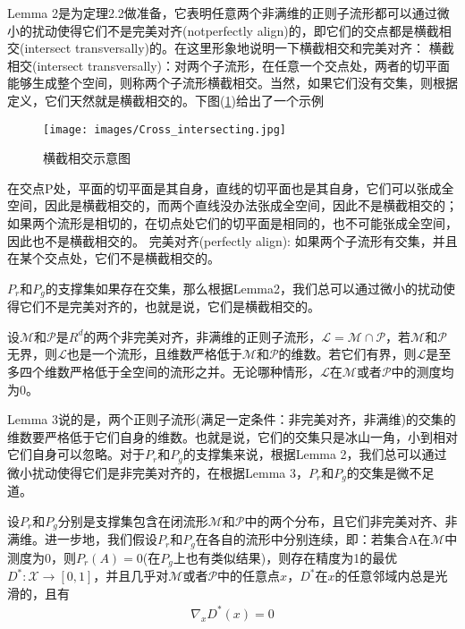             \par
            Lemma 2是为定理2.2做准备，它表明任意两个非满维的正则子流形都可以通过微小的扰动使得它们不是完美对齐(notperfectly align)的，即它们的交点都是横截相交(intersect transversally)的。在这里形象地说明一下横截相交和完美对齐：
            横截相交(intersect transversally)：对两个子流形，在任意一个交点处，两者的切平面能够生成整个空间，则称两个子流形横截相交。当然，如果它们没有交集，则根据定义，它们天然就是横截相交的。下图(\ref{fig:横截相交示意图})给出了一个示例
                \begin{figure}[H]
                \centering
                \texttt{[image: images/Cross\_intersecting.jpg]}
                \caption{横截相交示意图}
                \label{fig:横截相交示意图}
                \end{figure}
            在交点P处，平面的切平面是其自身，直线的切平面也是其自身，它们可以张成全空间，因此是横截相交的，而两个直线没办法张成全空间，因此不是横截相交的；如果两个流形是相切的，在切点处它们的切平面是相同的，也不可能张成全空间，因此也不是横截相交的。
            完美对齐(perfectly align): 如果两个子流形有交集，并且在某个交点处，它们不是横截相交的。
            \par
            $P_r$和$P_g$的支撑集如果存在交集，那么根据Lemma2，我们总可以通过微小的扰动使得它们不是完美对齐的，也就是说，它们是横截相交的。
            \begin{lemma}[Lemma 3]
            设$\mathcal{M}$和$\mathcal{P}$是$R^d$的两个非完美对齐，非满维的正则子流形，$\mathcal{L} = \mathcal{M}\cap \mathcal{P} $，若$\mathcal{M}$和$\mathcal{P}$无界，则$\mathcal{L}$也是一个流形，且维数严格低于$\mathcal{M}$和$\mathcal{P}$的维数。若它们有界，则$\mathcal{L}$是至多四个维数严格低于全空间的流形之并。无论哪种情形，$\mathcal{L}$在$\mathcal{M}$或者$\mathcal{P}$中的测度均为0。
            \end{lemma}
            \par
            Lemma 3说的是，两个正则子流形(满足一定条件：非完美对齐，非满维)的交集的维数要严格低于它们自身的维数。也就是说，它们的交集只是冰山一角，小到相对它们自身可以忽略。对于$P_r$和$P_g$的支撑集来说，根据Lemma 2，我们总可以通过微小扰动使得它们是非完美对齐的，在根据Lemma 3，$P_r$和$P_g$的交集是微不足道。
            \begin{theorem}[Theorem2.2]
            设$P_r$和$P_g$分别是支撑集包含在闭流形$\mathcal{M}$和$\mathcal{P}$中的两个分布，且它们非完美对齐、非满维。进一步地，我们假设$P_r$和$P_g$在各自的流形中分别连续，即：若集合A在$\mathcal{M}$中测度为0，则$P_r(A) = 0$(在$P_g$上也有类似结果)，则存在精度为1的最优$ D^*:\mathcal{X}\to [0,1]$，并且几乎对$\mathcal{M}$或者$\mathcal{P}$中的任意点$x$，$D^*$在$x$的任意邻域内总是光滑的，且有
            \begin{align*}
            \nabla_x D^*(x) = 0
            \end{align*}
            \end{theorem}
